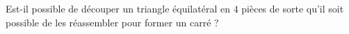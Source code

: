 Est-il possible de découper un triangle équilatéral en $4$ pièces de sorte qu'il soit possible de les réassembler pour former un carré ?